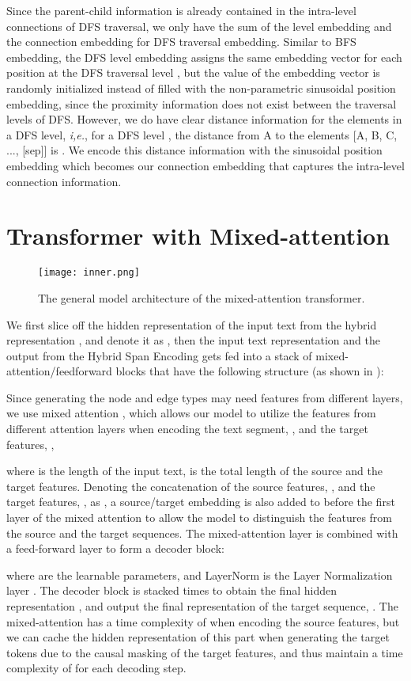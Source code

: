 \documentclass[11pt,a4paper]{article}
\begin{document}
Since the parent-child information is already contained in the intra-level connections of DFS traversal, we only have the sum of the level embedding and the connection embedding for DFS traversal embedding. Similar to BFS embedding, the DFS level embedding assigns the same embedding vector  for each position at the DFS traversal level , but the value of the embedding vector is randomly initialized instead of filled with the non-parametric sinusoidal position embedding, since the proximity information does not exist between the traversal levels of DFS. However, we do have clear distance information for the elements in a DFS level, \emph{i,e.}, for a DFS level , the distance from A to the elements [A, B, C, ..., [sep]] is . We encode this distance information with the sinusoidal position embedding which becomes our connection embedding that captures the intra-level connection information.

\section{Transformer with Mixed-attention}\label{mix}



\begin{figure}[t]
\centering
\texttt{[image: inner.png]}
\caption{The general model architecture of the mixed-attention transformer.}\label{fm}
\end{figure}

 We first slice off the hidden representation of the input text from the hybrid representation , and denote it as , then the input text representation  and the output from the Hybrid Span Encoding  gets fed into a stack of  mixed-attention/feedforward blocks that have the following structure (as shown in ):

Since generating the node and  edge types may need  features from different layers, we use mixed attention \cite{layerwise}, which allows our model to utilize the features from different attention layers when encoding the text  segment, , and the target features, ,

where  is the length of the input text,  is the total length of the source and the target features. Denoting the concatenation of the source features, , and the target features, , as , a source/target embedding \cite{layerwise} is also added to  before the first layer of the mixed attention to allow the model to distinguish the features from the source and the target sequences. The mixed-attention layer is  combined with a feed-forward layer to form a decoder block:

where  are the learnable parameters, and LayerNorm is the Layer Normalization layer \cite{LayerN}. The decoder block is stacked  times to obtain the final hidden representation , and output the final representation of the target sequence, . The mixed-attention has a time complexity of  when encoding the source features, but we can cache the hidden representation of this part when generating the target tokens due to the causal masking of the target features, and thus maintain a time complexity of  for each decoding step.
\end{document}
